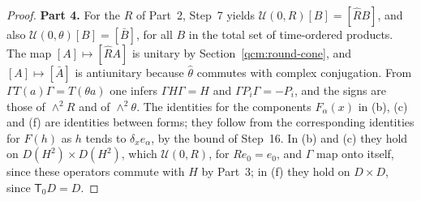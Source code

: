 \documentclass[11pt,letterpaper,reqno]{amsart}
\theoremstyle{definition}
\begin{document}
\begin{proof}
\textbf{Part 4.}
For the $R$ of Part~2, Step~7 yields $\mathcal U(0,R)[B]=[\hat RB]$, and also $\mathcal U(0,\theta)[B]=[\bar B]$, for all $B$ in the total set of time-ordered products.
The map $[A]\mapsto[\hat RA]$ is unitary by Section~\ref{qcm:round-cone}, and $[A]\mapsto[\bar A]$ is antiunitary because $\hat\theta$ commutes with complex conjugation.
From $\Gamma T(a)\Gamma=T(\theta a)$ one infers $\Gamma H\Gamma=H$ and $\Gamma P_i\Gamma=-P_i$, and the signs are those of $\wedge^2R$ and of $\wedge^2\theta$.
The identities for the components $F_\alpha(x)$ in (b), (c) and (f) are identities between forms; they follow from the corresponding identities for $F(h)$ as $h$ tends to $\delta_xe_\alpha$, by the bound of Step~16.
In (b) and (c) they hold on $D(H^2)\times D(H^2)$, which $\mathcal U(0,R)$, for $Re_0=e_0$, and $\Gamma$ map onto itself, since these operators commute with $H$ by Part~3; in (f) they hold on $D\times D$, since $\mathsf T_0D=D$.


\end{proof}
\end{document}
